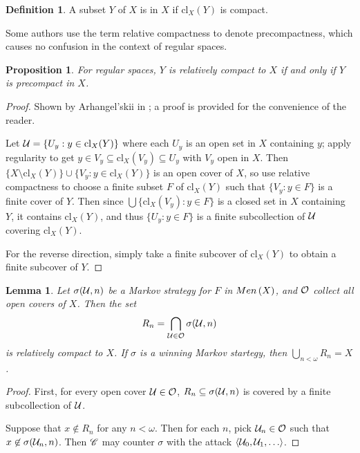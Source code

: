 \documentclass{amsart}
\newtheorem{proposition}[theorem]{Proposition}
\newtheorem{lemma}[theorem]{Lemma}
\theoremstyle{definition}
\newtheorem{definition}[theorem]{Definition}
\begin{document}
\begin{definition}
  A subset \(Y\) of \(X\) is  in \(X\) if
  \(\text{cl}_X(Y)\) is compact.
\end{definition}

Some authors use the term
relative compactness to denote precompactness, which causes
no confusion in the context of regular spaces.

\begin{proposition}
  For regular spaces, \(Y\) is relatively compact to \(X\) if and only if
  \(Y\) is precompact in \(X\).
\end{proposition}

\begin{proof}
  Shown by Arhangel'skii in \cite{MR1885790}; a proof is provided for the
  convenience of the reader.

  Let \(\mathcal{U}=\{U_y:y\in\text{cl}_X(Y)\}\) where each \(U_y\) is an open
  set in \(X\) containing \(y\); apply regularity to get
  \(y\in V_{y}\subseteq\text{cl}_X(V_{y})\subseteq U_{y}\)
  with \(V_{y}\) open in \(X\).
  Then \(\{X\setminus\text{cl}_X(Y)\}\cup\{V_{y}:y\in \text{cl}_X(Y)\}\)
  is an open cover of \(X\), so
  use relative compactness to choose a finite subset \(F\) of \(\text{cl}_X(Y)\)
  such that \(\{V_{y}:y\in F\}\) is a finite cover of \(Y\). Then since
  \(\bigcup\{\text{cl}_X(V_{y}):y\in F\}\) is a closed set in \(X\)
  containing \(Y\), it contains \(\text{cl}_X(Y)\), and thus
  \(\{U_{y}:y\in F\}\) is a finite subcollection of \(\mathcal{U}\) covering
  \(\text{cl}_X(Y)\).

  For the reverse direction, simply take a finite subcover of
  \(\text{cl}_X(Y)\) to obtain a finite subcover of \(Y\).
\end{proof}

\begin{lemma}
  Let \(\sigma(\mathcal{U}, n)\) be a Markov strategy for \(F\) in
  \(Men\left({X}\right)\), and \(\mathcal{O}\) collect all open covers of \(X\). Then the
  set
    \[
      R_n = \bigcap_{\mathcal{U}\in\mathcal{O}} \sigma(\mathcal{U},n)
    \]
  is relatively compact to \(X\). If \(\sigma\) is a winning
  Markov startegy, then \(\bigcup_{n<\omega} R_n = X\).
\end{lemma}

\begin{proof}
  First, for every open cover \(\mathcal{U}\in\mathcal{O}\),
  \(R_n\subseteq\sigma(\mathcal{U},n)\) is covered by a finite subcollection of \(\mathcal{U}\).

  Suppose that \(x \not\in R_n\) for any \(n<\omega\). Then for each \(n\),
  pick \(\mathcal{U}_n\in\mathcal{O}\) such that \(x\not\in \sigma(\mathcal{U}_n,n)\). Then
  \(\mathscr{C}\) may counter \(\sigma\) with the attack \(\<\mc U_0,\mc U_1,\dots\>\).
\end{proof}
\end{document}
